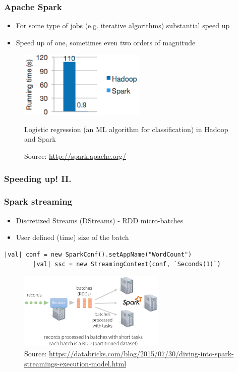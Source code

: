 \documentclass[10pt,utf8]{beamer}
\begin{document}
\begin{frame}
	\frametitle{Apache Spark}
		\begin{itemize}
			\item For some type of jobs (e.g. iterative algorithms) substantial speed up
			\item Speed up of one, sometimes even two orders of magnitude
		\end{itemize}
	  \begin{figure}
			\centering
			\includegraphics[width=6cm]{./img/hadoop_vs_spark.eps}
			\caption{\tiny{Logistic regression (an ML algorithm for classification) in Hadoop and Spark}}
			\vspace{-0.7cm}
			\caption{\tiny{Source: \url{http://spark.apache.org/}}}
		\end{figure}
\end{frame}

\begin{frame}
	\frametitle{Speeding up! II.}
	\vspace{0.5cm}
	\vspace{0.5cm}
\end{frame}

\begin{frame}[fragile]
	\frametitle{Spark streaming}
	\begin{itemize}
	 \item Discretized Streams (DStreams) - RDD micro-batches
	 \item User defined (time) size of the batch
	\end{itemize}

	\begin{lstlisting}[style=Java]
		|val| conf = new SparkConf().setAppName("WordCount")
		|val| ssc = new StreamingContext(conf, `Seconds(1)`)
	\end{lstlisting}
	
	\begin{figure}
		\centering
		\includegraphics[width=7cm]{./img/spark-streaming2.eps}
		\caption{\tiny{Source: \url{https://databricks.com/blog/2015/07/30/diving-into-spark-streamings-execution-model.html}}}
	\end{figure}
\end{frame}
\end{document}
